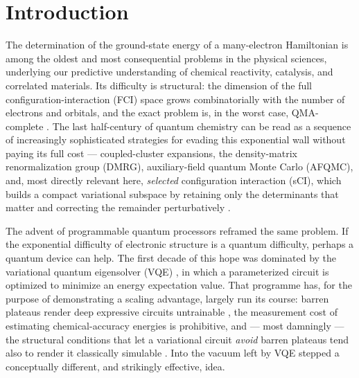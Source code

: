 \documentclass[onecolumn,a4paper]{quantumarticle}
\begin{document}
\section{Introduction}\label{sec:1}

The determination of the ground-state energy of a many-electron Hamiltonian is among the oldest and most consequential problems in the physical sciences, underlying our predictive understanding of chemical reactivity, catalysis, and correlated materials. Its difficulty is structural: the dimension of the full configuration-interaction (FCI) space grows combinatorially with the number of electrons and orbitals, and the exact problem is, in the worst case, QMA-complete \cite{kempe2006}. The last half-century of quantum chemistry can be read as a sequence of increasingly sophisticated strategies for evading this exponential wall without paying its full cost --- coupled-cluster expansions, the density-matrix renormalization group (DMRG), auxiliary-field quantum Monte Carlo (AFQMC), and, most directly relevant here, \emph{selected} configuration interaction (sCI), which builds a compact variational subspace by retaining only the determinants that matter and correcting the remainder perturbatively \cite{huron1973,holmes2016,sharma2017,tubman2016}.

The advent of programmable quantum processors reframed the same problem. If the exponential difficulty of electronic structure is a quantum difficulty, perhaps a quantum device can help. The first decade of this hope was dominated by the variational quantum eigensolver (VQE) \cite{peruzzo2014}, in which a parameterized circuit is optimized to minimize an energy expectation value. That programme has, for the purpose of demonstrating a scaling advantage, largely run its course: barren plateaus render deep expressive circuits untrainable \cite{mcclean2018,larocca2025}, the measurement cost of estimating chemical-accuracy energies is prohibitive, and --- most damningly --- the structural conditions that let a variational circuit \emph{avoid} barren plateaus tend also to render it classically simulable \cite{cerezo2025}. Into the vacuum left by VQE stepped a conceptually different, and strikingly effective, idea.
\end{document}
